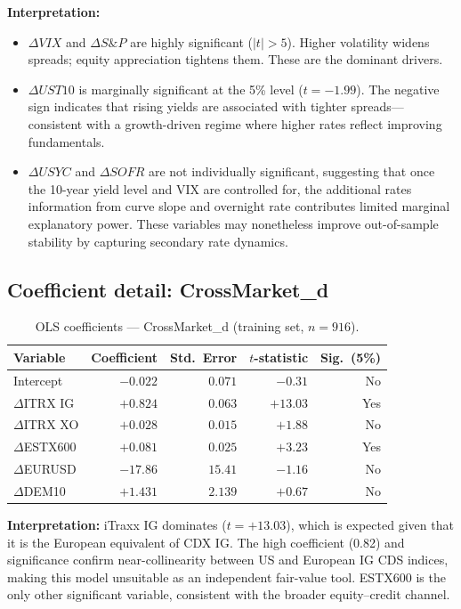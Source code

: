\textbf{Interpretation:}
\begin{itemize}
  \item \(\Delta VIX\) and \(\Delta S\&P\) are highly significant
    (\(|t| > 5\)). Higher volatility widens spreads; equity appreciation
    tightens them. These are the dominant drivers.
  \item \(\Delta UST10\) is marginally significant at the 5\% level
    (\(t = -1.99\)). The negative sign indicates that rising yields are
    associated with tighter spreads---consistent with a growth-driven regime
    where higher rates reflect improving fundamentals.
  \item \(\Delta USYC\) and \(\Delta SOFR\) are not individually significant,
    suggesting that once the 10-year yield level and VIX are controlled for,
    the additional rates information from curve slope and overnight rate
    contributes limited marginal explanatory power. These variables may
    nonetheless improve out-of-sample stability by capturing secondary rate
    dynamics.
\end{itemize}

\subsection*{Coefficient detail: CrossMarket\_d}

\begin{table}[H]
\centering
\small
\caption{OLS coefficients --- CrossMarket\_d (training set, \(n = 916\)).}
\label{tab:coef_cm}
\begin{tabular}{lrrrr}
\toprule
Variable & Coefficient & Std.\ Error & \(t\)-statistic & Sig.\ (5\%) \\
\midrule
Intercept           & $-0.022$ & $0.071$ &  $-0.31$ & No  \\
\(\Delta\)ITRX IG   & $+0.824$ & $0.063$ & $+13.03$ & Yes \\
\(\Delta\)ITRX XO   & $+0.028$ & $0.015$ &  $+1.88$ & No  \\
\(\Delta\)ESTX600   & $+0.081$ & $0.025$ &  $+3.23$ & Yes \\
\(\Delta\)EURUSD    & $-17.86$ & $15.41$ &  $-1.16$ & No  \\
\(\Delta\)DEM10     & $+1.431$ & $2.139$ &  $+0.67$ & No  \\
\bottomrule
\end{tabular}
\end{table}

\textbf{Interpretation:}
iTraxx IG dominates (\(t = +13.03\)), which is expected given that it is the
European equivalent of CDX IG. The high coefficient (0.82) and significance
confirm near-collinearity between US and European IG CDS indices, making this
model unsuitable as an independent fair-value tool. ESTX600 is the only other
significant variable, consistent with the broader equity--credit channel.

